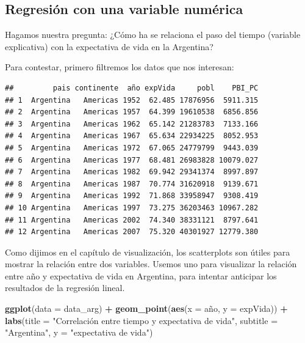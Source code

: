 \documentclass[]{book}
\newenvironment{Shaded}{\begin{snugshade}}{\end{snugshade}}
\newcommand{\KeywordTok}[1]{\textcolor[rgb]{0.13,0.29,0.53}{\textbf{#1}}}
\newcommand{\DataTypeTok}[1]{\textcolor[rgb]{0.13,0.29,0.53}{#1}}
\newcommand{\StringTok}[1]{\textcolor[rgb]{0.31,0.60,0.02}{#1}}
\newcommand{\OperatorTok}[1]{\textcolor[rgb]{0.81,0.36,0.00}{\textbf{#1}}}
\newcommand{\NormalTok}[1]{#1}
\begin{document}
\subsection{Regresión con una variable
numérica}\label{regresion-con-una-variable-numerica}

Hagamos nuestra pregunta: ¿Cómo ha se relaciona el paso del tiempo
(variable explicativa) con la expectativa de vida en la Argentina?

Para contestar, primero filtremos los datos que nos interesan:

\begin{Shaded}
\end{Shaded}

\begin{verbatim}
##         pais continente  año expVida     pobl    PBI_PC
## 1  Argentina   Americas 1952  62.485 17876956  5911.315
## 2  Argentina   Americas 1957  64.399 19610538  6856.856
## 3  Argentina   Americas 1962  65.142 21283783  7133.166
## 4  Argentina   Americas 1967  65.634 22934225  8052.953
## 5  Argentina   Americas 1972  67.065 24779799  9443.039
## 6  Argentina   Americas 1977  68.481 26983828 10079.027
## 7  Argentina   Americas 1982  69.942 29341374  8997.897
## 8  Argentina   Americas 1987  70.774 31620918  9139.671
## 9  Argentina   Americas 1992  71.868 33958947  9308.419
## 10 Argentina   Americas 1997  73.275 36203463 10967.282
## 11 Argentina   Americas 2002  74.340 38331121  8797.641
## 12 Argentina   Americas 2007  75.320 40301927 12779.380
\end{verbatim}

Como dijimos en el capítulo de visualización, los scatterplots son
útiles para mostrar la relación entre dos variables. Usemos uno para
visualizar la relación entre año y expectativa de vida en Argentina,
para intentar anticipar los resultados de la regresión lineal.

\begin{Shaded}
\begin{Highlighting}[]
\KeywordTok{ggplot}\NormalTok{(}\DataTypeTok{data =}\NormalTok{ data_arg) }\OperatorTok{+}\StringTok{ }
\StringTok{    }\KeywordTok{geom_point}\NormalTok{(}\KeywordTok{aes}\NormalTok{(}\DataTypeTok{x =}\NormalTok{ año, }\DataTypeTok{y =}\NormalTok{ expVida)) }\OperatorTok{+}
\StringTok{    }\KeywordTok{labs}\NormalTok{(}\DataTypeTok{title =} \StringTok{"Correlación entre tiempo y expectativa de vida"}\NormalTok{,}
         \DataTypeTok{subtitle =} \StringTok{"Argentina"}\NormalTok{,}
         \DataTypeTok{y =} \StringTok{"expectativa de vida"}\NormalTok{)}
\end{Highlighting}
\end{Shaded}
\end{document}
